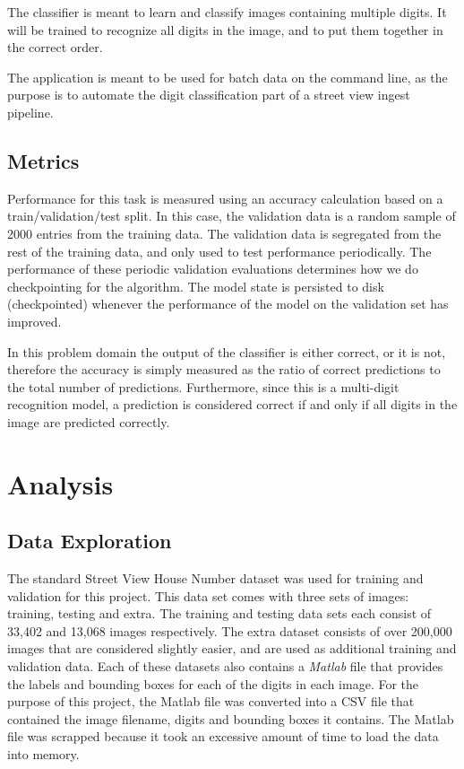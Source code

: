 \documentclass[12pt]{article}
\begin{document}
The classifier is meant to learn and classify images containing multiple digits. It will be trained to recognize all digits in the image, and to put them together in the correct order.

The application is meant to be used for batch data on the command line, as the purpose is to automate the digit classification part of a street view ingest pipeline.

\subsection{Metrics}
Performance for this task is measured using an accuracy calculation based on a train/validation/test split.
In this case, the validation data is a random sample of 2000 entries from the training data.
The validation data is segregated from the rest of the training data, and only used to test performance periodically.
The performance of these periodic validation evaluations determines how we do checkpointing for the algorithm.
The model state is persisted to disk (checkpointed) whenever the performance of the model on the validation set has improved.

In this problem domain the output of the classifier is either correct, or it is not, therefore the accuracy is simply measured as the ratio of correct predictions to the total number of predictions.
Furthermore, since this is a multi-digit recognition model, a prediction is considered correct if and only if all digits in the image are predicted correctly.

\section{Analysis}
\subsection{Data Exploration} \label{sssec:data_exploration}
The standard Street View House Number dataset\cite{svhn_dataset} was used for training and validation for this project. 
This data set comes with three sets of images: training, testing and extra. 
The training and testing data sets each consist of 33,402 and 13,068 images respectively. 
The extra dataset consists of over 200,000 images that are considered slightly easier, and are used as additional training and validation data. 
Each of these datasets also contains a \textit{Matlab} file that provides the labels and bounding boxes for each of the digits in each image.
For the purpose of this project, the Matlab file was converted into a CSV file that contained the image filename, digits and bounding boxes it contains. 
The Matlab file was scrapped because it took an excessive amount of time to load the data into memory. 
\end{document}
